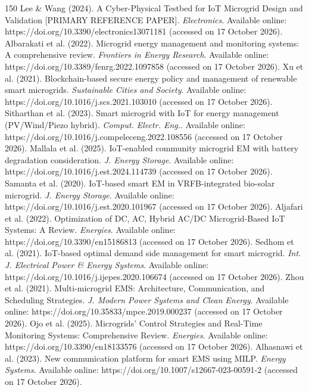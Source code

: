 \begin{thebibliography}{150}
Lee \& Wang (2024). A Cyber-Physical Testbed for IoT Microgrid Design and Validation [PRIMARY REFERENCE PAPER]. \textit{Electronics}. Available online: https://doi.org/10.3390/electronics13071181 (accessed on 17 October 2026).
Albarakati et al. (2022). Microgrid energy management and monitoring systems: A comprehensive review. \textit{Frontiers in Energy Research}. Available online: https://doi.org/10.3389/fenrg.2022.1097858 (accessed on 17 October 2026).
Xu et al. (2021). Blockchain-based secure energy policy and management of renewable smart microgrids. \textit{Sustainable Cities and Society}. Available online: https://doi.org/10.1016/j.scs.2021.103010 (accessed on 17 October 2026).
Sitharthan et al. (2023). Smart microgrid with IoT for energy management (PV/Wind/Piezo hybrid). \textit{Comput. Electr. Eng.}. Available online: https://doi.org/10.1016/j.compeleceng.2022.108556 (accessed on 17 October 2026).
Mallala et al. (2025). IoT-enabled community microgrid EM with battery degradation consideration. \textit{J. Energy Storage}. Available online: https://doi.org/10.1016/j.est.2024.114739 (accessed on 17 October 2026).
Samanta et al. (2020). IoT-based smart EM in VRFB-integrated bio-solar microgrid. \textit{J. Energy Storage}. Available online: https://doi.org/10.1016/j.est.2020.101967 (accessed on 17 October 2026).
Aljafari et al. (2022). Optimization of DC, AC, Hybrid AC/DC Microgrid-Based IoT Systems: A Review. \textit{Energies}. Available online: https://doi.org/10.3390/en15186813 (accessed on 17 October 2026).
Sedhom et al. (2021). IoT-based optimal demand side management for smart microgrid. \textit{Int. J. Electrical Power \& Energy Systems}. Available online: https://doi.org/10.1016/j.ijepes.2020.106674 (accessed on 17 October 2026).
Zhou et al. (2021). Multi-microgrid EMS: Architecture, Communication, and Scheduling Strategies. \textit{J. Modern Power Systems and Clean Energy}. Available online: https://doi.org/10.35833/mpce.2019.000237 (accessed on 17 October 2026).
Ojo et al. (2025). Microgrids' Control Strategies and Real-Time Monitoring Systems: Comprehensive Review. \textit{Energies}. Available online: https://doi.org/10.3390/en18133576 (accessed on 17 October 2026).
Alhasnawi et al. (2023). New communication platform for smart EMS using MILP. \textit{Energy Systems}. Available online: https://doi.org/10.1007/s12667-023-00591-2 (accessed on 17 October 2026).

\end{thebibliography}
